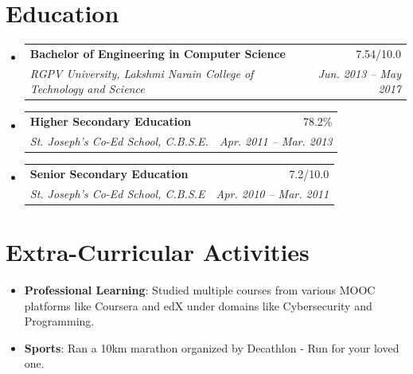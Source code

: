 \documentclass[letterpaper,11pt]{article}
\makeatletter
\newcommand{\resumeSubheading}[4]{
  \vspace{-2pt}\item
    \begin{tabular*}{0.97\textwidth}[t]{l@{\extracolsep{\fill}}r}
      \textbf{#1} & #2 \\
      \textit{\small#3} & \textit{\small #4} \\
    \end{tabular*}\vspace{-7pt}
}
\newcommand{\resumeSubHeadingListStart}{\begin{itemize}[leftmargin=0.15in, label={}]}
\newcommand{\resumeSubHeadingListEnd}{\end{itemize}}
\makeatother
\begin{document}
\section{Education}
  \resumeSubHeadingListStart
    \resumeSubheading
      {Bachelor of Engineering in Computer Science}{7.54/10.0}
      {RGPV University, Lakshmi Narain College of Technology and Science}{Jun. 2013 -- May 2017}
    \resumeSubheading
      {Higher Secondary Education}{78.2\%}
      {St. Joseph's Co-Ed School, C.B.S.E.}{Apr. 2011 -- Mar. 2013}
    \resumeSubheading
      {Senior Secondary Education}{7.2/10.0}
      {St. Joseph's Co-Ed School, C.B.S.E}{Apr. 2010 -- Mar. 2011}
  \resumeSubHeadingListEnd

\section{Extra-Curricular Activities}
 \begin{itemize}
     \item { \textbf {Professional Learning}{: Studied multiple courses from various MOOC platforms like Coursera and edX under domains like Cybersecurity and Programming.}}
     \item {\textbf {Sports}{: Ran a 10km marathon organized by Decathlon - Run for your loved one.}}
 \end{itemize}

\end{document}
